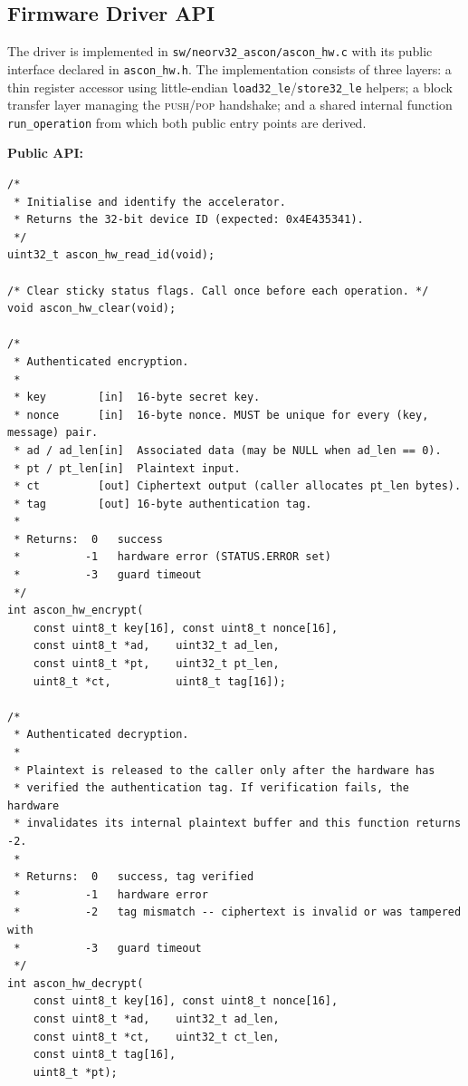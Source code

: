 \documentclass[11pt,a4paper]{article}
\begin{document}
\subsection{Firmware Driver API}

The driver is implemented in \texttt{sw/neorv32\_ascon/ascon\_hw.c} with its
public interface declared in \texttt{ascon\_hw.h}. The implementation consists
of three layers: a thin register accessor using little-endian
\texttt{load32\_le}/\texttt{store32\_le} helpers; a block transfer layer
managing the \textsc{push}/\textsc{pop} handshake; and a shared internal
function \texttt{run\_operation} from which both public entry points are derived.

\medskip
\textbf{Public API:}

\begin{lstlisting}[language=myc, caption={Firmware driver public interface (\texttt{ascon\_hw.h})}]
/*
 * Initialise and identify the accelerator.
 * Returns the 32-bit device ID (expected: 0x4E435341).
 */
uint32_t ascon_hw_read_id(void);

/* Clear sticky status flags. Call once before each operation. */
void ascon_hw_clear(void);

/*
 * Authenticated encryption.
 *
 * key        [in]  16-byte secret key.
 * nonce      [in]  16-byte nonce. MUST be unique for every (key, message) pair.
 * ad / ad_len[in]  Associated data (may be NULL when ad_len == 0).
 * pt / pt_len[in]  Plaintext input.
 * ct         [out] Ciphertext output (caller allocates pt_len bytes).
 * tag        [out] 16-byte authentication tag.
 *
 * Returns:  0   success
 *          -1   hardware error (STATUS.ERROR set)
 *          -3   guard timeout
 */
int ascon_hw_encrypt(
    const uint8_t key[16], const uint8_t nonce[16],
    const uint8_t *ad,    uint32_t ad_len,
    const uint8_t *pt,    uint32_t pt_len,
    uint8_t *ct,          uint8_t tag[16]);

/*
 * Authenticated decryption.
 *
 * Plaintext is released to the caller only after the hardware has
 * verified the authentication tag. If verification fails, the hardware
 * invalidates its internal plaintext buffer and this function returns -2.
 *
 * Returns:  0   success, tag verified
 *          -1   hardware error
 *          -2   tag mismatch -- ciphertext is invalid or was tampered with
 *          -3   guard timeout
 */
int ascon_hw_decrypt(
    const uint8_t key[16], const uint8_t nonce[16],
    const uint8_t *ad,    uint32_t ad_len,
    const uint8_t *ct,    uint32_t ct_len,
    const uint8_t tag[16],
    uint8_t *pt);
\end{lstlisting}
\end{document}
